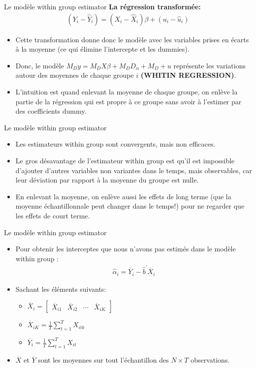 \documentclass{beamer}
\begin{document}
\begin{frame}{Le modèle within group estimator}
\textbf{La régression transformée:}
\begin{align*}
(Y_i-\hat{Y}_i)=(X_i-\hat{X}_i) \beta+(u_i-\hat{u}_i)
\end{align*}
\begin{itemize}
\item Cette transformation donne donc le modèle avec les variables prises en écarts à la moyenne (ce qui élimine l’intercepte et les dummies).
\item Donc, le modèle $M_D y = M_D X\beta + M_D D_{\alpha}+M_D+u$ représente les variations autour des moyennes de chaque groupe $i$ \textbf{(WHITIN REGRESSION)}. 
\item  L’intuition est quand enlevant la moyenne de chaque groupe, on enlève la partie de la régression qui est propre à ce groupe sans avoir à l’estimer par des coefficients dummy.
\end{itemize}
\end{frame}

\begin{frame}{Le modèle within group estimator}
\begin{itemize}
\item Les estimateurs within group sont convergents, mais non efficaces.
\item Le gros désavantage de l’estimateur within group est qu’il est impossible d’ajouter d’autres variables non variantes dans le temps, mais observables, car leur déviation par rapport à la moyenne du groupe est nulle. 
\item En enlevant la moyenne, on enlève aussi les effets de long terme (que la moyenne échantillonnale peut changer dans le temps!) pour ne regarder que les effets de court terme.
\end{itemize}
\end{frame}

\begin{frame}{Le modèle within group estimator}
\begin{itemize}
\item Pour obtenir les interceptes que nous n’avons pas estimés dans le modèle within group :
\begin{align*}
\hat{\alpha}_i=\overline{Y}_i-\hat{b}^{'}\overline{X}_i
\end{align*}
\item Sachant les éléments suivants:
\begin{itemize}
\item $\overline{X}_i=\begin{bmatrix} 
\overline{X}_{i1} & \overline{X}_{i2} & \cdots & \overline{X}_{iK}
\end{bmatrix}$
\item $\overline{X}_{iK}=\frac{1}{T}\sum_{t=1}^{T}X_{itk}$
\item $\overline{Y}_{i}=\frac{1}{T}\sum_{t=1}^{T}X_{it}$
\end{itemize}
\item $\overline{X}$ et $\overline{Y}$ sont les moyennes sur tout l'échantillon des $N \times T$ observations.
\end{itemize}
\end{frame}
\end{document}
